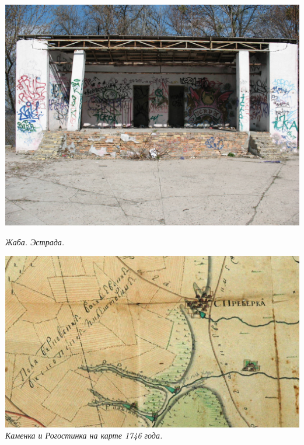 \begin{center}
\includegraphics[width=\linewidth]{rpix/IMG_1402.JPG}

\textit{Жаба. Эстрада.}
\end{center}

\newpage

\vspace*{\fill}


\begin{center}
\includegraphics[width=\linewidth]{rpix/kamenka.jpg}
\textit{Каменка и Рогостинка на карте 1746 года.}
\end{center}


